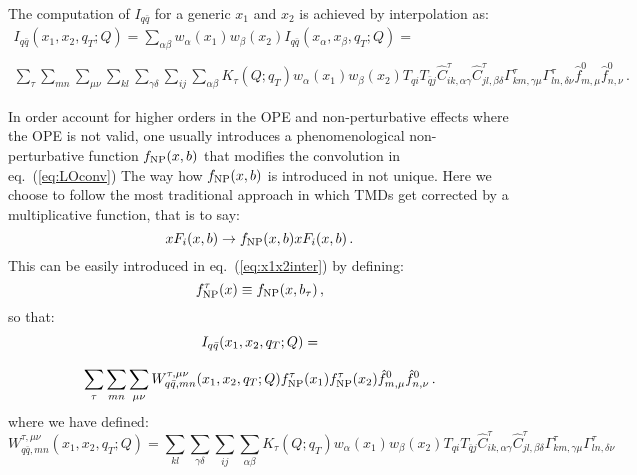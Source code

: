 \documentclass[10pt,a4paper]{article}
\begin{document}
The computation of $I_{q\bar{q}}$ for a generic $x_1$ and $x_2$ is
achieved by interpolation as:
\begin{equation}\label{eq:x1x2inter}
\begin{array}{c}
  \displaystyle I_{q\bar{q}}(x_1,x_2,q_T;Q) =
  \sum_{\alpha\beta}w_\alpha(x_1)w_\beta(x_2)I_{q\bar{q}}(x_\alpha,x_\beta,q_T;Q)
  =\\
\\
\displaystyle \sum_\tau \sum_{mn}\sum_{\mu\nu}\sum_{kl} \sum_{\gamma\delta} \sum_{ij}\sum_{\alpha\beta} K_\tau(Q;q_T) w_\alpha(x_1)w_\beta(x_2) T_{qi}T_{\bar{q}j}\hat{C}_{ik,\alpha\gamma}^\tau \hat{C}_{jl,\beta\delta}^\tau\Gamma_{km,\gamma\mu}^\tau\Gamma_{ln,\delta\nu}^\tau\hat{f}_{m,\mu}^0 \hat{f}_{n,\nu}^0\,.
\end{array}
\end{equation}

In order account for higher orders in the OPE and non-perturbative
effects where the OPE is not valid, one usually introduces a
phenomenological non-perturbative function $f_{\rm NP}(x,b)$ that
modifies the convolution in eq.~(\ref{eq:LOconv}) The way how
$f_{\rm NP}(x,b)$ is introduced in not unique. Here we choose to
follow the most traditional approach in which TMDs get corrected by a
multiplicative function, that is to say:
\begin{equation}\label{eq:LOconvNP1}
xF_i(x,b) \rightarrow f_{\rm NP}(x,b) xF_i(x,b)\,.
\end{equation}
This can be easily introduced in eq.~(\ref{eq:x1x2inter}) by defining:
\begin{equation}
f_{\rm NP}^\tau(x) \equiv f_{\rm NP}(x,b_\tau)\,,
\end{equation}
so that:
\begin{equation}
\begin{array}{c}
  \displaystyle I_{q\bar{q}}(x_1,x_2,q_T;Q) =\\
  \\
  \displaystyle \displaystyle \sum_\tau \sum_{mn}\sum_{\mu\nu} W_{q\bar{q},mn}^{\tau,\mu\nu}(x_1,x_2,q_T;Q) f_{\rm NP}^\tau(x_1) f_{\rm NP}^\tau(x_2)\hat{f}_{m,\mu}^0 \hat{f}_{n,\nu}^0\,.
\end{array}
\end{equation}
where we have defined:
\begin{equation}
W_{q\bar{q},mn}^{\tau,\mu\nu}(x_1,x_2,q_T;Q) = \sum_{kl} \sum_{\gamma\delta} \sum_{ij}\sum_{\alpha\beta} K_\tau(Q;q_T) w_\alpha(x_1)w_\beta(x_2) T_{qi}T_{\bar{q}j}\hat{C}_{ik,\alpha\gamma}^\tau \hat{C}_{jl,\beta\delta}^\tau\Gamma_{km,\gamma\mu}^\tau\Gamma_{ln,\delta\nu}^\tau
\end{equation}
\end{document}
